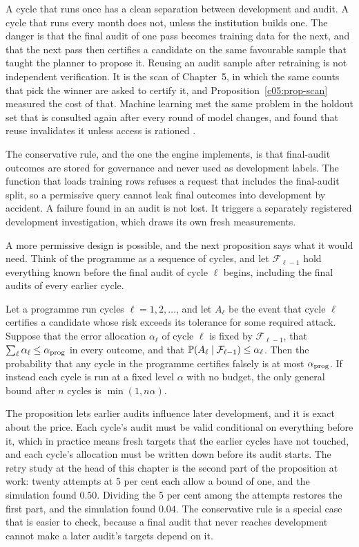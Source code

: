 A cycle that runs once has a clean separation between development and audit. A cycle that
runs every month does not, unless the institution builds one. The danger is that the final
audit of one pass becomes training data for the next, and that the next pass then certifies
a candidate on the same favourable sample that taught the planner to propose it. Reusing
an audit sample after retraining is not independent verification. It is the scan of Chapter~5,
in which the same counts that pick the winner are asked to certify it, and Proposition~\ref{c05:prop-scan}
measured the cost of that. Machine learning met the same problem in the holdout set that
is consulted again after every round of model changes, and found that reuse invalidates it
unless access is rationed \citep{dwork2015}.

The conservative rule, and the one the engine implements, is that final-audit outcomes
are stored for governance and never used as development labels. The function that loads
training rows refuses a request that includes the final-audit split, so a permissive query
cannot leak final outcomes into development by accident. A failure found in an audit is
not lost. It triggers a separately registered development investigation, which draws its own
fresh measurements.

A more permissive design is possible, and the next proposition says what it would need.
Think of the programme as a sequence of cycles, and let $\mathcal F_{\ell-1}$ hold everything known before
the final audit of cycle $\ell$ begins, including the final audits of every earlier cycle.

\begin{proposition}\label{c18:prop-cycles}
Let a programme run cycles $\ell=1,2,\dots$, and let $A_\ell$ be the event that cycle $\ell$ certifies a candidate whose risk exceeds its tolerance for some
required attack. Suppose that the error allocation $\alpha_\ell$ of cycle $\ell$ is fixed by $\mathcal F_{\ell-1}$, that $\sum_\ell\alpha_\ell\le\alpha_{\rm prog}$ in
every outcome, and that $\mathbb{P}(A_\ell\mid\mathcal F_{\ell-1})\le\alpha_\ell$. Then the probability that any cycle in the programme
certifies falsely is at most $\alpha_{\rm prog}$. If instead each cycle is run at a fixed level $\alpha$ with no budget, the only
general bound after $n$ cycles is $\min(1,n\alpha)$.
\end{proposition}

The proposition lets earlier audits influence later development, and it is exact about the
price. Each cycle's audit must be valid conditional on everything before it, which in practice
means fresh targets that the earlier cycles have not touched, and each cycle's allocation must
be written down before its audit starts. The retry study at the head of this chapter is the
second part of the proposition at work: twenty attempts at 5 per cent each allow a bound of
one, and the simulation found $0.50$. Dividing the 5 per cent among the attempts restores the
first part, and the simulation found $0.04$. The conservative rule is a special case that is easier
to check, because a final audit that never reaches development cannot make a later audit's
targets depend on it.

